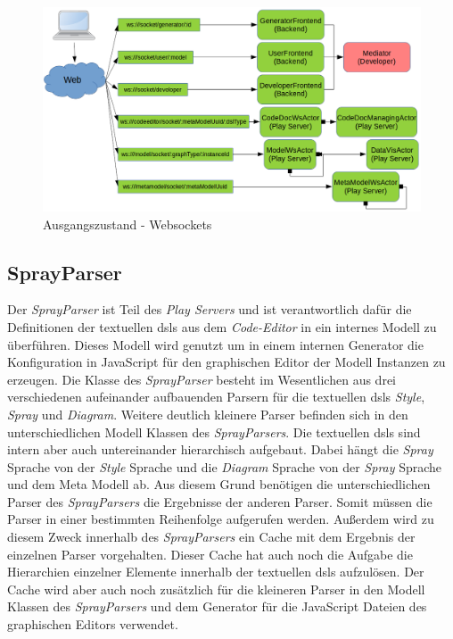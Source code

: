 \begin{figure}
    \centering
    \includegraphics[width=5in]{figures/actor_play_before.png}
    \caption{Ausgangszustand - Websockets}
    \label{fig:ZETA_WS_OLD}
\end{figure}

\subsection{SprayParser}

Der \textit{SprayParser} ist Teil des \textit{Play Servers} und ist verantwortlich dafür die Definitionen der textuellen \acp{dsl} aus dem \textit{Code-Editor} in ein internes Modell zu überführen. Dieses Modell wird genutzt um in einem internen Generator die Konfiguration in JavaScript für den graphischen Editor der Modell Instanzen zu erzeugen. Die Klasse des \textit{SprayParser} besteht im Wesentlichen aus drei verschiedenen aufeinander aufbauenden Parsern für die textuellen \acp{dsl} \textit{Style}, \textit{Spray} und \textit{Diagram}. Weitere deutlich kleinere Parser befinden sich in den unterschiedlichen Modell Klassen des \textit{SprayParsers}. Die textuellen \acp{dsl} sind intern aber auch untereinander hierarchisch aufgebaut. Dabei hängt die \textit{Spray} Sprache von der \textit{Style} Sprache und die \textit{Diagram} Sprache von der \textit{Spray} Sprache und dem Meta Modell ab. Aus diesem Grund benötigen die unterschiedlichen Parser des \textit{SprayParsers} die Ergebnisse der anderen Parser. Somit müssen die Parser in einer bestimmten Reihenfolge aufgerufen werden. Außerdem wird zu diesem Zweck innerhalb des \textit{SprayParsers} ein Cache mit dem Ergebnis der einzelnen Parser vorgehalten. Dieser Cache hat auch noch die Aufgabe die Hierarchien einzelner Elemente innerhalb der textuellen \acp{dsl} aufzulösen. Der Cache wird aber auch noch zusätzlich für die kleineren Parser in den Modell Klassen des \textit{SprayParsers} und dem Generator für die JavaScript Dateien des graphischen Editors verwendet.

